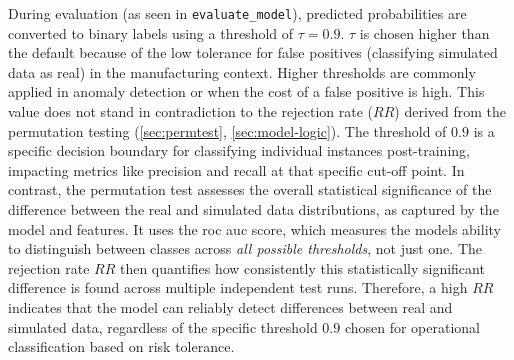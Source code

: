 During evaluation (as seen in \texttt{evaluate\_model}), predicted probabilities are converted to binary labels using a threshold of $\tau = 0.9$. $\tau$ is chosen higher than the default because of the low tolerance for false positives (classifying simulated data as real) in the manufacturing context. Higher thresholds are commonly applied in anomaly detection or when the cost of a false positive is high. This value does not stand in contradiction to the rejection rate ($RR$) derived from the permutation testing (\autoref{sec:permtest}, \autoref{sec:model-logic}). The threshold of $0.9$ is a specific decision boundary for classifying individual instances post-training, impacting metrics like precision and recall at that specific cut-off point. In contrast, the permutation test assesses the overall statistical significance of the difference between the real and simulated data distributions, as captured by the model and features. It uses the \gls{roc} \gls{auc} score, which measures the models ability to distinguish between classes across \textit{all possible thresholds}, not just one. The rejection rate $RR$ then quantifies how consistently this statistically significant difference is found across multiple independent test runs. Therefore, a high $RR$ indicates that the model can reliably detect differences between real and simulated data, regardless of the specific threshold $0.9$ chosen for operational classification based on risk tolerance.

